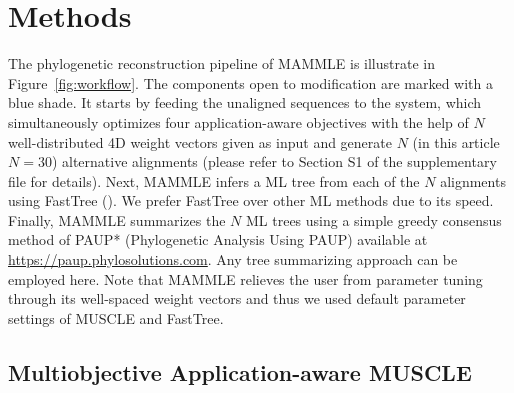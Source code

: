 \section{Methods}
The phylogenetic reconstruction pipeline of MAMMLE is illustrate in Figure~\ref{fig:workflow}. The components open to modification are marked with a blue shade. It starts by feeding the unaligned sequences to the system, which simultaneously optimizes four application-aware objectives with the help of $N$ well-distributed 4D weight vectors given as input and generate $N$ (in this article $N=30$) alternative alignments (please refer to Section S1 of the supplementary file for details). %
Next, MAMMLE infers a ML tree from each of the $N$ alignments using FastTree (\cite{price2010fasttree}). We prefer FastTree over other ML methods due to its speed. Finally, MAMMLE summarizes the $N$ ML trees using a simple greedy consensus method of PAUP* (Phylogenetic Analysis Using PAUP) available at \url{https://paup.phylosolutions.com}. Any tree summarizing approach can be employed here. Note that MAMMLE relieves the user from parameter tuning through its well-spaced weight vectors and thus we used default parameter settings of MUSCLE and FastTree. 





\subsection{Multiobjective Application-aware MUSCLE} \label{sec:ma-muscle}

